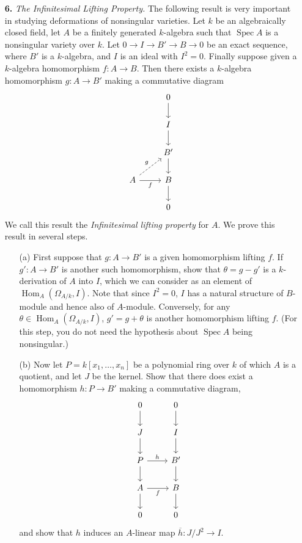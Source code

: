 \documentclass{article}
\DeclareMathOperator{\Hom}{Hom}
\DeclareMathOperator{\spec}{Spec}
\begin{document}
\begin{enumerate} [label=\textbf{\arabic*.}, leftmargin=0em]
\item[\textbf{6.}] \textit{The Infinitesimal Lifting Property.} The following result is very important in studying deformations of nonsingular varieties. Let $k$ be an algebraically closed field, let $A$ be a finitely generated $k$-algebra such that $\spec{A}$ is a nonsingular variety over $k$. Let $0 \to I \to B' \to B \to 0$ be an exact sequence, where $B'$ is a $k$-algebra, and $I$ is an ideal with $I^2 = 0$. Finally suppose given a $k$-algebra homomorphism $f : A \to B$. Then there exists a $k$-algebra homomorphism $g : A \to B'$ making a commutative diagram
\[ \begin{tikzcd}
    & 0 \arrow[d]  \\
    & I \arrow[d]  \\
    & B' \arrow[d] \\
A \arrow[r, "f"'] \arrow[ru, "g", dashed] & B \arrow[d]  \\
    & 0           
\end{tikzcd} \]
We call this result the \textit{Infinitesimal lifting property} for $A$. We prove this result in several steps.
\begin{itemize} [leftmargin=0cm]
    \item[(a)] First suppose that $g : A \to B'$ is a given homomorphism lifting $f$. If $g' : A \to B'$ is another such homomorphism, show that $\theta = g - g'$ is a $k$-derivation of $A$ into $I$, which we can consider as an element of $\Hom_A(\Omega_{A / k}, I)$. Note that since $I^2 = 0$, $I$ has a natural structure of $B$-module and hence also of $A$-module. Conversely, for any $\theta \in \Hom_A(\Omega_{A/k}, I)$, $g' = g + \theta$ is another homomorphism lifting $f$. (For this step, you do not need the hypothesis about $\spec{A}$ being nonsingular.)
    
    \item[(b)] Now let $P = k[x_1, \dots, x_n]$ be a polynomial ring over $k$ of which $A$ is a quotient, and let $J$ be the kernel. Show that there does exist a homomorphism $h : P \to B'$ making a commutative diagram,
    \[ \begin{tikzcd}
        0 \arrow[d]                 & 0 \arrow[d]  \\
        J \arrow[d]                 & I \arrow[d]  \\
        P \arrow[d] \arrow[r, "h"]  & B' \arrow[d] \\
        A \arrow[d] \arrow[r, "f"'] & B \arrow[d]  \\
        0                           & 0           
        \end{tikzcd} \]
    and show that $h$ induces an $A$-linear map $\overline{h} : J / J^2 \to I$.
    

\end{itemize}
\end{enumerate}
\end{document}
